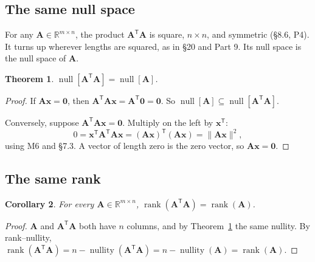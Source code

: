 \documentclass[11pt]{article}
\theoremstyle{plain}
\newtheorem{thm}{Theorem}[section]
\newtheorem{cor}[thm]{Corollary}
\theoremstyle{definition}
\theoremstyle{remark}
\newcommand{\R}{\mathbb{R}}
\newcommand{\vc}[1]{\mathbf{#1}}
\newcommand{\mt}[1]{\mathbf{#1}}
\newcommand{\norm}[1]{\lVert #1\rVert}
\newcommand{\T}{^{\mathsf{T}}}
\newcommand{\nullsp}[1]{\operatorname{null}[#1]}
\DeclareMathOperator{\rank}{rank}
\DeclareMathOperator{\nullity}{nullity}
\begin{document}
\subsection{The same null space}
For any $\mt{A}\in\R^{m\times n}$, the product $\mt{A}\T\mt{A}$ is square,
$n\times n$, and symmetric (\S8.6, P4). It turns up wherever lengths are squared,
as in \S20 and Part 9. Its null space is the null space of $\mt{A}$.

\begin{thm}
\label{thm:samenull}
$\nullsp{\mt{A}\T\mt{A}}=\nullsp{\mt{A}}$.
\end{thm}

\begin{proof}
If $\mt{A}\vc{x}=\vc{0}$, then $\mt{A}\T\mt{A}\vc{x}=\mt{A}\T\vc{0}=\vc{0}$. So
$\nullsp{\mt{A}}\subseteq\nullsp{\mt{A}\T\mt{A}}$.

Conversely, suppose $\mt{A}\T\mt{A}\vc{x}=\vc{0}$. Multiply on the left by
$\vc{x}\T$:
\[
  0=\vc{x}\T\mt{A}\T\mt{A}\vc{x}=(\mt{A}\vc{x})\T(\mt{A}\vc{x})=\norm{\mt{A}\vc{x}}^{2},
\]
using M6 and \S7.3. A vector of length zero is the zero vector, so
$\mt{A}\vc{x}=\vc{0}$.
\end{proof}

\subsection{The same rank}
\begin{cor}
\label{cor:ATA}
For every $\mt{A}\in\R^{m\times n}$, $\rank(\mt{A}\T\mt{A})=\rank(\mt{A})$.
\end{cor}

\begin{proof}
$\mt{A}$ and $\mt{A}\T\mt{A}$ both have $n$ columns, and by
Theorem~\ref{thm:samenull} the same nullity. By rank--nullity,
$\rank(\mt{A}\T\mt{A})=n-\nullity(\mt{A}\T\mt{A})=n-\nullity(\mt{A})=\rank(\mt{A})$.
\end{proof}
\end{document}
